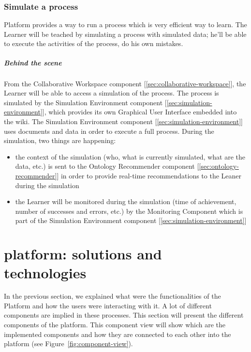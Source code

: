 \documentclass{learnpad}
\begin{document}
\subsection{Simulate a process}
\learnpad Platform provides a way to run a process which is very efficient way
to learn.  The Learner will be teached by simulating a process with simulated
data; he'll be able to execute the activities of the process, do his own
mistakes.

\paragraph{Behind the scene}
From the Collaborative Workspace component [\ref{sec:collaborative-workspace}],
the Learner will be able to access a simulation of the process.  The process is
simulated by the Simulation Environment component
[\ref{sec:simulation-environment}], which provides its own Graphical User
Interface embedded into the wiki.  The Simulation Environment component
[\ref{sec:simulation-environment}] uses documents and data in order to execute a
full process.  During the simulation, two things are happening:
\begin{itemize}
	\item the context of the simulation (who, what is currently simulated, what
		are the data, etc.) is sent to the Ontology Recommender component
		[\ref{sec:ontology-recommender}] in order to provide real-time
		recommendations to the Leaner during the simulation
	\item the Learner will be monitored during the simulation (time of
		achievement, number of successes and errors, etc.) by the Monitoring
		Component which is part of the Simulation Environment component
		[\ref{sec:simulation-environment}]
\end{itemize}

\chapter{\learnpad platform: solutions and technologies}
\label{ch:platform}
In the previous section, we explained what were the functionalities of the
\learnpad Platform and how the users were interacting with it.  A lot of
different components are implied in these processes.  This section will present
the different components of the \learnpad platform.  This component view will
show which are the implemented components and how they are connected to each
other into the \learnpad platform (see Figure~\ref{fig:component-view}).
\end{document}
